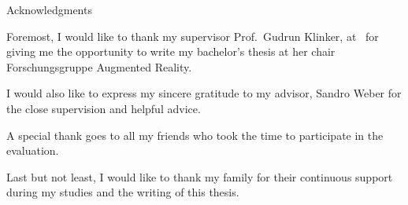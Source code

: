 \newpage
{}
\thispagestyle{empty}

\vspace*{20mm}

\begin{center}
{ Acknowledgments}
\end{center}

\vspace{10mm}

Foremost, I would like to thank my supervisor Prof.\ Gudrun Klinker, at \getUniversity\ for giving me the opportunity to write my bachelor's thesis at her chair Forschungsgruppe Augmented Reality.

I would also like to express my sincere gratitude to my advisor, Sandro Weber for the close supervision and helpful advice.

A special thank goes to all my friends who took the time to participate in the evaluation.

Last but not least, I would like to thank my family for their continuous support during my studies and the writing of this thesis.

\cleardoublepage{}
